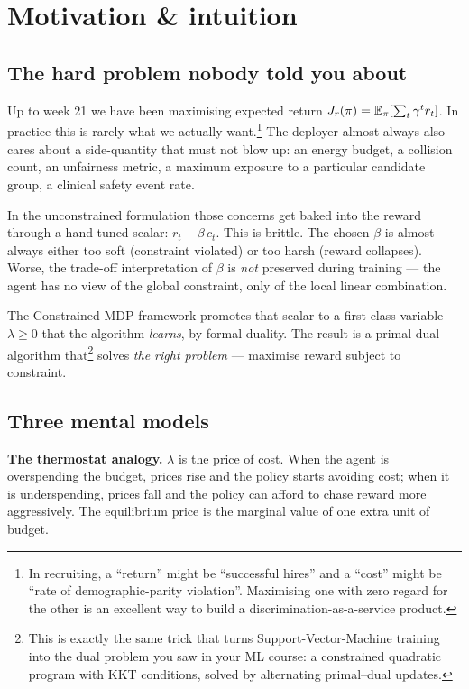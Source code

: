 \documentclass[11pt,oneside]{scrbook}
\begin{document}
\chapter{Motivation \& intuition}

\section{The hard problem nobody told you about}

Up to week 21 we have been maximising expected return $J_r(\pi)
= \mathbb{E}_\pi [\sum_t \gamma^t r_t]$. In practice this is rarely what we actually
want.\footnote{In recruiting, a ``return'' might be ``successful hires'' and a
``cost'' might be ``rate of demographic-parity violation''. Maximising one with
zero regard for the other is an excellent way to build a discrimination-as-a-service
product.}
The deployer almost always also cares about a side-quantity that must not
blow up: an energy budget, a collision count, an unfairness metric, a maximum
exposure to a particular candidate group, a clinical safety event rate.

In the unconstrained formulation those concerns get baked into the reward
through a hand-tuned scalar: $r_t - \beta\, c_t$. This is brittle. The chosen
$\beta$ is almost always either too soft (constraint violated) or too harsh
(reward collapses). Worse, the trade-off interpretation of $\beta$ is
\emph{not} preserved during training --- the agent has no view of the global
constraint, only of the local linear combination.

The Constrained MDP framework promotes that scalar to a first-class variable
$\lambda \geq 0$ that the algorithm \emph{learns}, by formal duality. The
result is a primal-dual algorithm that\footnote{This is exactly the same
trick that turns Support-Vector-Machine training into the dual problem you
saw in your ML course: a constrained quadratic program with KKT conditions,
solved by alternating primal--dual updates.}
solves \emph{the right problem} --- maximise reward subject to constraint.

\section{Three mental models}

\begin{intuition}\textbf{The thermostat analogy.}
$\lambda$ is the price of cost. When the agent is overspending the budget,
prices rise and the policy starts avoiding cost; when it is underspending,
prices fall and the policy can afford to chase reward more aggressively. The
equilibrium price is the marginal value of one extra unit of budget.
\end{intuition}
\end{document}
